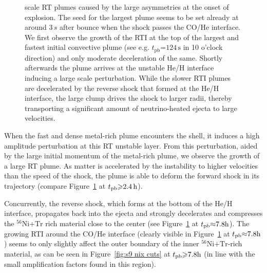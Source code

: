 \documentclass[fleqn,usenatbib]{mnras}
\newcommand{\tpb}{\ensuremath{t_{\text{pb}}}}
\newcommand{\nickel}{\ensuremath{\mathrm{^{56}Ni}}\xspace}
\newcommand{\tracer}{\ensuremath{\mathrm{Tr}}\xspace}
\newcommand{\s}{\ensuremath{\text{s}}}
\begin{document}
\begin{figure}
{        scale RT plumes caused by the large asymmetries at the onset of explosion.
        The seed for the largest plume seems to be set already at around $3\,s$ 
        after bounce when the shock passes the CO/He interface. We first observe
        the growth of the RTI at the top of the largest and fastest initial convective plume 
        (see e.g. $\tpb\mathord{=}124\,\s$ in 10 o'clock direction) 
        and only moderate deceleration of the same.
        Shortly afterwards the plume arrives at the unstable He/H interface 
        inducing a large scale perturbation.
        While the slower RTI plumes are decelerated by the reverse shock that formed 
        at the He/H interface, the large
        clump drives the shock to larger radii, thereby transporting a 
        significant amount of neutrino-heated ejecta to large velocities.
    }
\label{fig:s9 rho cuts}
\end{figure}%

When the fast and dense metal-rich plume encounters the shell, it induces a high amplitude perturbation at this RT unstable layer. 
From this perturbation, aided by the large initial momentum of the metal-rich plume, we observe the growth of a large RT plume. As matter is accelerated by the instability to higher velocities than the speed of the shock, the plume is able to deform the forward shock in its trajectory (compare Figure~\ref{fig:s9 rho cuts} at $\tpb\mathord{\geq}2.4\,\rm h$).

Concurrently, the reverse shock, which forms at the bottom of the He/H interface, 
propagates back into the ejecta and strongly decelerates and compresses the 
$\nickel\mathord{+}\tracer$ rich material close to the center 
(see Figure~\ref{fig:s9 rho cuts} at $\tpb\mathord{\approx}7.8\rm h$). 
The growing RTI around the CO/He interface (clearly visible in Figure~\ref{fig:s9 rho cuts} at
$\tpb\mathord{\approx}7.8\rm h$)
seems to only slightly affect the outer boundary of the inner $\nickel\mathord{+}\tracer$-rich
material, as can be seen in Figure~\ref{fig:s9 nix cuts} at $\tpb\mathord{\geq}7.8\rm h$ (in
line with the small amplification factors found in this region).
\end{document}
